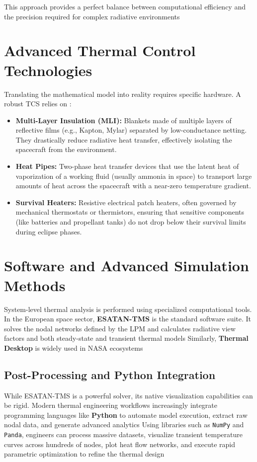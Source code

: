This approach provides a perfect balance between computational efficiency and the precision required for 
complex radiative environments %

\section{Advanced Thermal Control Technologies}
Translating the mathematical model into reality requires specific hardware. A robust TCS relies on \cite{tcs_slides0,th_handbook}:
\begin{itemize}
    \item \textbf{Multi-Layer Insulation (MLI):} Blankets made of multiple layers of reflective films (e.g., Kapton, Mylar) separated by low-conductance netting. They drastically reduce radiative heat transfer, effectively isolating the spacecraft from the environment.
    \item \textbf{Heat Pipes:} Two-phase heat transfer devices that use the latent heat of vaporization of a working fluid (usually ammonia in space) to transport large amounts of heat across the spacecraft with a near-zero temperature gradient.
    \item \textbf{Survival Heaters:} Resistive electrical patch heaters, often governed by mechanical thermostats or thermistors, ensuring that sensitive components (like batteries and propellant tanks) do not drop below their survival limits during eclipse phases.
\end{itemize}

\section{Software and Advanced Simulation Methods}
System-level thermal analysis is performed using specialized computational tools. In the European space sector,
\textbf{ESATAN-TMS} is the standard software suite. It solves the nodal networks defined by the LPM and 
calculates radiative view factors and both steady-state and transient thermal models %
Similarly, \textbf{Thermal Desktop} is widely used in NASA ecosystems %

\subsection{Post-Processing and Python Integration}
While ESATAN-TMS is a powerful solver, its native visualization capabilities can be rigid. %
Modern thermal engineering workflows increasingly integrate programming languages like \textbf{Python} to 
automate model execution, extract raw nodal data, and generate advanced analytics %
Using libraries such as \texttt{NumPy} and \texttt{Panda}, engineers can process massive datasets, 
visualize transient temperature curves across hundreds of nodes, plot heat flow networks, and execute rapid 
parametric optimization to refine the thermal design %





